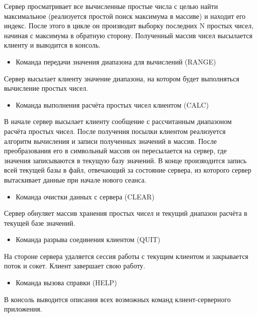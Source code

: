 Сервер просматривает все вычисленные простые числа с целью найти максимальное (реализуется простой поиск максимума в массиве) и находит его индекс. После этого в цикле он производит выборку последних N простых чисел, начиная с максимума в обратную сторону. Полученный массив чисел высылается клиенту и выводится в консоль.

\begin{itemize}
	\item Команда передачи значения диапазона для вычислений (RANGE)
\end{itemize}

Сервер высылает клиенту значение диапазона, на котором будет выполняться вычисление простых чисел.

\begin{itemize}
	\item Команда выполнения расчёта простых чисел клиентом (CALC)
\end{itemize}

В начале сервер высылает клиенту сообщение с рассчитанным диапазоном расчёта простых чисел. После получения посылки клиентом реализуется алгоритм вычисления и записи полученных значений в массив. После преобразования его в символьный массив он пересылается на сервер, где значения записываются в текущую базу значений. В конце производится запись всей текущей базы в файл, отвечающий за состояние сервера, из которого сервер вытаскивает данные при начале нового сеанса.

\begin{itemize}
	\item Команда очистки данных с сервера (CLEAR)
\end{itemize}

Сервер обнуляет массив хранения простых чисел и текущий диапазон расчёта в текущей базе значений.

\begin{itemize}
	\item Команда разрыва соединения клиентом (QUIT)
\end{itemize}

На стороне сервера удаляется сессия работы с текущим клиентом и закрывается поток и сокет. Клиент завершает свою работу.

\begin{itemize}
	\item Команда вызова справки (HELP)
\end{itemize}

В консоль выводится описания всех возможных команд клиент-серверного приложения.

